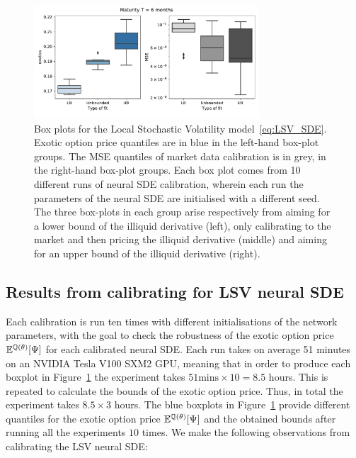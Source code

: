 \begin{figure}[H]
    \centering
    \includegraphics[clip,width=0.75\textwidth]{content/reschap1/Figures/figures_SPX/lookback_bounds_mse.pdf} 
  \caption{Box plots for the Local Stochastic Volatility model~\eqref{eq:LSV_SDE}. Exotic option price quantiles are in blue in the left-hand box-plot groups. The MSE quantiles of market data calibration is in grey, in the right-hand box-plot groups. Each box plot comes from 10 different runs of neural SDE calibration, wherein each run the parameters of the neural SDE are initialised with a different seed. The three box-plots in each group arise respectively from aiming for a lower bound of the illiquid derivative (left), only calibrating to the market and then pricing the illiquid derivative (middle) and aiming for an upper bound of the illiquid derivative (right).}\label{fig:SPX LSV boxplots}
\end{figure}


\subsection{Results from calibrating for LSV neural SDE}
Each calibration is run ten times with different initialisations of the network parameters, with the goal to check the robustness of the exotic option price 
 $\mathbb{E}^{\mathbb{Q}(\theta)}[\Psi]$ for each calibrated neural SDE. Each run takes on average 51 minutes on an NVIDIA Tesla V100 SXM2 GPU, meaning that in order to produce each boxplot in Figure~\ref{fig:SPX LSV boxplots} the experiment takes $51 \text{mins} \times 10 = 8.5$ hours. This is repeated to calculate the bounds of the exotic option price. Thus, in total the experiment takes $8.5 \times 3$ hours.
The blue boxplots in Figure~\ref{fig:SPX LSV boxplots} provide different quantiles for the exotic option 
 price $\mathbb{E}^{\mathbb{Q}(\theta)}[\Psi]$ and the obtained bounds after running all the experiments $10$ times. 
We make the following observations from calibrating the LSV neural SDE:

